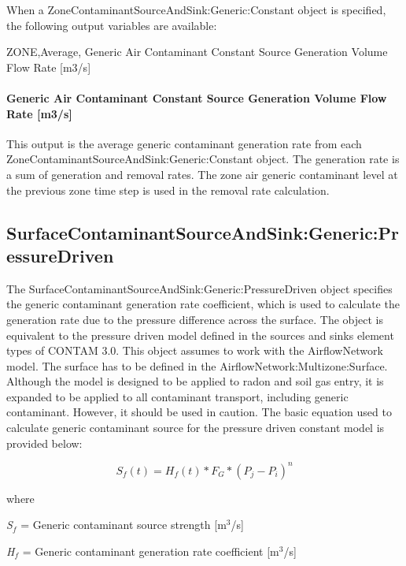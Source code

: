 When a ZoneContaminantSourceAndSink:Generic:Constant object is specified, the following output variables are available:

ZONE,Average, Generic Air Contaminant Constant Source Generation Volume Flow Rate {[}m3/s{]}

\paragraph{Generic Air Contaminant Constant Source Generation Volume Flow Rate {[}m3/s{]}}\label{generic-air-contaminant-constant-source-generation-volume-flow-rate-m3s}

This output is the average generic contaminant generation rate from each ZoneContaminantSourceAndSink:Generic:Constant object. The generation rate is a sum of generation and removal rates. The zone air generic contaminant level at the previous zone time step is used in the removal rate calculation.

\subsection{Surface\-Contaminant\-Source\-And\-Sink:\-Generic:\-Pressure\-Driven}\label{surfacecontaminantsourceandsinkgenericpressuredriven}

The Surface\-Contaminant\-Source\-And\-Sink:\-Generic:\-Pressure\-Driven object specifies the generic contaminant generation rate coefficient, which is used to calculate the generation rate due to the pressure difference across the surface. The object is equivalent to the pressure driven model defined in the sources and sinks element types of CONTAM 3.0. This object assumes to work with the AirflowNetwork model. The surface has to be defined in the AirflowNetwork:Multizone:Surface. Although the model is designed to be applied to radon and soil gas entry, it is expanded to be applied to all contaminant transport, including generic contaminant. However, it should be used in caution. The basic equation used to calculate generic contaminant source for the pressure driven constant model is provided below:

\begin{equation}
{S_f}(t) = {H_f}(t)*{F_G}*{\left( {{P_j} - {P_i}} \right)^n}
\end{equation}

where

\emph{S\(_{f}\)} = Generic contaminant source strength {[}m\(^{3}\)/s{]}

\emph{H\(_{f}\)} = Generic contaminant generation rate coefficient {[}m\(^{3}\)/s{]}

